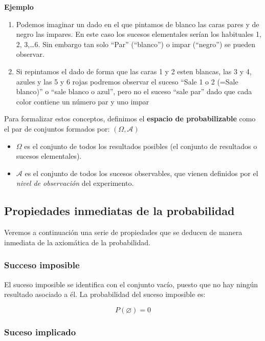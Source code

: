 \documentclass[
]{article}
\providecommand{\tightlist}{%
  \setlength{\itemsep}{0pt}\setlength{\parskip}{0pt}}
\begin{document}
\textbf{Ejemplo}

\begin{enumerate}
\def\labelenumi{\arabic{enumi}.}
\item
  Podemos imaginar un dado en el que pintamos de blanco las caras pares y de negro las impares. En este caso los sucesos elementales serían los habituales 1, 2, 3,\ldots6.
  Sin embargo tan solo ``Par'' (``blanco'') o impar (``negro'') se pueden observar.
\item
  Si repintamos el dado de forma que las caras 1 y 2 esten blancas, las 3 y 4, azules y las 5 y 6 rojas podremos observar el suceso ``Sale 1 o 2 (=Sale blanco)'' o ``sale blanco o azul'', pero no el suceso ``sale par'' dado que cada color contiene un número par y uno impar
\end{enumerate}

Para formalizar estos conceptos, definimos el \textbf{espacio de probabilizable} como el par de conjuntos formados por: \((\Omega, \mathcal{A})\)

\begin{itemize}
\tightlist
\item
  \(\Omega\) es el conjunto de todos los resultados posibles (el conjunto de resultados o sucesos elementales).
\item
  \(\mathcal{A}\) es el conjunto de todos los sucesos observables, que vienen definidos por el \emph{nivel de observación} del experimento.
\end{itemize}

\subsection{Propiedades inmediatas de la probabilidad}\label{propiedades-inmediatas-de-la-probabilidad}

Veremos a continuación una serie de propiedades que se deducen de manera
inmediata de la axiomática de la probabilidad.

\subsubsection{Succeso imposible}\label{succeso-imposible}

El suceso imposible se identifica con el conjunto vacío, puesto que no hay ningún resultado asociado a él. La probabilidad del suceso imposible es:

\[
P(\varnothing)=0
\]

\subsubsection{Suceso implicado}\label{suceso-implicado}
\end{document}

